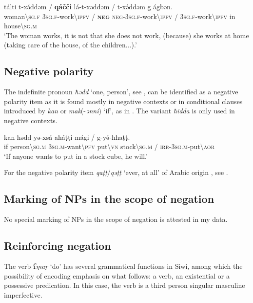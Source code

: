 \documentclass[output=paper,colorlinks,citecolor=brown]{langscibook}
\begin{document}
\ea\label{ex:siw:65}
    \gll t\'{a}lti t-xə́ddəm / \textbf{qáčči} l\'{a}-t-xəddəm / t-xə́ddəm g ágbən. \\
         woman{\textbackslash}\textsc{sg.f} \textsc{3sg.f}-work{\textbackslash}\textsc{ipfv} / \textbf{\textsc{neg}} \textsc{neg-3sg.f}-work{\textbackslash}\textsc{ipfv} / \textsc{3sg.f}-work{\textbackslash}\textsc{ipfv} in house{\textbackslash}\textsc{sg.m}\\
    \glt ‘The woman works, it is not that she does not work, (because) she works at home (taking care of the house, of the children...).’
\z

\subsection{Negative polarity}\label{sec:siw:4.2}

The indefinite pronoun \textit{ħədd} ‘one, person’, see , can be identified as a negative polarity item as it is found mostly in negative contexts or in conditional clauses introduced by \textit{kan} or \textit{mak}(-\textit{ənni}) ‘if’, as in . The variant \textit{ħidda} is only used in negative contexts. 


\ea\label{ex:siw:66}
    \gll kan ħədd  yə-xs\'{a} aħáṭṭi mági / g-yə́-ħħaṭṭ.\\
         if person{\textbackslash}\textsc{sg.m} \textsc{3sg.m}{}-want{\textbackslash}\textsc{pfv} put{\textbackslash}\textsc{vn} stock{\textbackslash}\textsc{sg.m} / \textsc{irr-3sg.m}{}-put{\textbackslash}\textsc{aor} \\
    \glt ‘If anyone wants to put in a stock cube, he will.’
\z

For the negative polarity item \textit{qaṭṭ}/\textit{qəṭṭ} ‘ever, at all’ of Arabic origin \citep{Souag2009}, see .


\subsection{Marking of NPs in the scope of negation}\label{sec:siw:4.3}

No special marking of NPs in the scope of negation is attested in my data.


\subsection{Reinforcing negation}\label{sec:siw:4.4}

The verb \textit{ʕṃaṛ} ‘do’ has several grammatical functions in Siwi, among which the possibility of encoding emphasis on what follows: a verb, an existential or a possessive predication. In this case, the verb is a third person singular masculine imperfective. 
\end{document}
